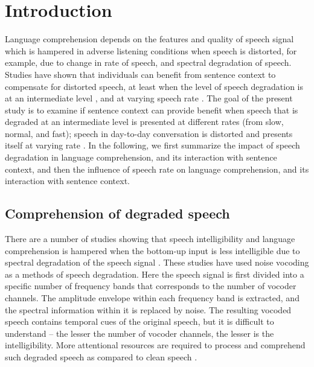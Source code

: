 \documentclass[a4paper, nobind]{templates/ociamthesis}
\begin{document}
\hypertarget{introduction-3}{%
\section{Introduction}\label{introduction-3}}

Language comprehension depends on the features and quality of speech signal
which is hampered in adverse listening conditions when speech is distorted, for example, due to change in rate of speech, and spectral degradation of speech.
Studies have shown that individuals can benefit from sentence context to compensate for distorted speech, at least when the level of speech degradation is at an intermediate level \autocites[e.g.,][]{Obleser2010,Bhandari2021}, and at varying speech rate \autocites{Aydelott2004}[cf.][]{Goy2013}.
The goal of the present study is to examine if sentence context can provide benefit when speech that is degraded at an intermediate level is presented at different rates (from slow, normal, and fast); speech in day-to-day conversation is distorted and presents itself at varying rate \autocite[e.g.,][]{Krause2004}.
In the following, we first summarize the impact of speech degradation in language comprehension, and its interaction with sentence context, and then the influence of speech rate on language comprehension, and its interaction with sentence context.

\hypertarget{comprehension-of-degraded-speech}{%
\subsection{Comprehension of degraded speech}\label{comprehension-of-degraded-speech}}

There are a number of studies showing that speech intelligibility and language comprehension is hampered when the bottom-up input is less intelligible due to spectral degradation of the speech signal \autocite{Shannon1995,Davis2005}.
These studies have used noise vocoding as a methods of speech degradation. Here the speech signal is first divided into a specific number of frequency bands that corresponds to the number of vocoder channels.
The amplitude envelope within each frequency band is extracted, and the spectral information within it is replaced by noise.
The resulting vocoded speech contains temporal cues of the original speech, but it is difficult to understand -- the lesser the number of vocoder channels, the lesser is the intelligibility.
More attentional resources are required to process and comprehend such degraded speech as compared to clean speech \autocites[e.g.,][]{Wild2012,Eckert2016}.
\end{document}

